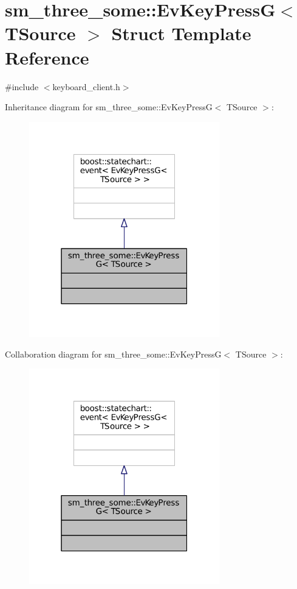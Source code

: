 \hypertarget{structsm__three__some_1_1EvKeyPressG}{}\section{sm\+\_\+three\+\_\+some\+:\+:Ev\+Key\+PressG$<$ T\+Source $>$ Struct Template Reference}
\label{structsm__three__some_1_1EvKeyPressG}


{\ttfamily \#include $<$keyboard\+\_\+client.\+h$>$}



Inheritance diagram for sm\+\_\+three\+\_\+some\+:\+:Ev\+Key\+PressG$<$ T\+Source $>$\+:
\nopagebreak
\begin{figure}[H]
\begin{center}
\leavevmode
\includegraphics[width=235pt]{structsm__three__some_1_1EvKeyPressG__inherit__graph}
\end{center}
\end{figure}


Collaboration diagram for sm\+\_\+three\+\_\+some\+:\+:Ev\+Key\+PressG$<$ T\+Source $>$\+:
\nopagebreak
\begin{figure}[H]
\begin{center}
\leavevmode
\includegraphics[width=235pt]{structsm__three__some_1_1EvKeyPressG__coll__graph}
\end{center}
\end{figure}


